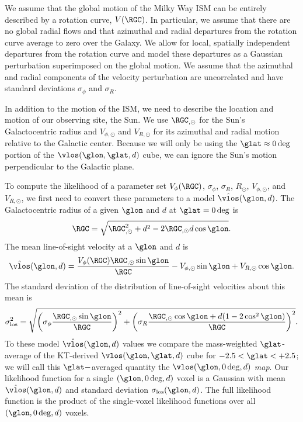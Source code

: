 We assume that the global motion of the Milky Way ISM can be entirely described by a rotation curve, $V(\RGC)$. 
In particular, we assume that there are no global radial flows and that azimuthal and radial departures from the rotation curve average to zero over the Galaxy.
We allow for local, spatially independent departures from the rotation curve and model these departures as a Gaussian perturbation superimposed on the global motion. 
We assume that the azimuthal and radial components of the velocity perturbation are uncorrelated and have standard deviations $\sigma_\phi$ and $\sigma_R$.

In addition to the motion of the ISM, we need to describe the location and motion of our observing site, the Sun. 
We use $\RGC_{, \odot}$ for the Sun's Galactocentric radius and $V_{\phi, \odot}$ and $V_{R, \odot}$ for its azimuthal and radial motion relative to the Galactic center. 
Because we will only be using the $\glat \approx 0 \deg$ portion of the $\vlos(\glon, \glat, d)$ cube, we can ignore the Sun's motion perpendicular to the Galactic plane.

To compute the likelihood of a parameter set $V_\phi (\RGC)$, $\sigma_\phi$, $\sigma_R$, $R_{\odot}$, $V_{\phi, \odot}$, and $V_{R, \odot}$, we first need to convert these parameters to a model $\hat{\vlos}(\glon, d)$. 
The Galactocentric radius of a given $\glon$ and $d$ at $\glat = 0 \deg$ is 
\begin{equation}
\RGC = \sqrt{\RGC^2_{,\odot} + d^2 - 2 \RGC_{, \odot} d \cos \glon}.
\end{equation}
The mean line-of-sight velocity at a $\glon$ and $d$ is
\begin{equation}
\label{eqn:vlos_mean}
\hat{\vlos}(\glon, d) = \frac{V_\phi (\RGC) \RGC_{,\odot} \sin\glon}{\RGC}  - V_{\phi, \odot} \sin \glon + V_{R, \odot} \cos \glon.
\end{equation}
The standard deviation of the distribution of line-of-sight velocities about this mean is 
\begin{equation}
\label{eqn:vlos_var}
\sigma^2_\mathrm{los} = \sqrt{\left(\sigma_\phi \frac{\RGC_{,\odot} \sin \glon}{\RGC} \right)^2 + 
\left(\sigma_R  \frac{\RGC_{,\odot} \cos \glon + d (1 - 2 \cos^2 \glon)}{\RGC} \right)^2}.
\end{equation}
To these model $\hat{\vlos}(\glon, d)$ values we compare the mass-weighted $\glat$-average of the KT-derived $\vlos(\glon, \glat, d)$ cube for $-2.5 < \glat < + 2.5$; we will call this $\glat-$averaged quantity the $\vlos(\glon, 0 \deg, d)$ \emph{map}.
Our likelihood function for a single $(\glon, 0\deg, d)$ voxel is a Gaussian with mean $\hat{\vlos}(\glon, d)$ and standard deviation $\sigma_\mathrm{los}(\glon, d)$.
The full likelihood function is the product of the single-voxel likelihood functions over all $(\glon, 0\deg, d)$ voxels.

